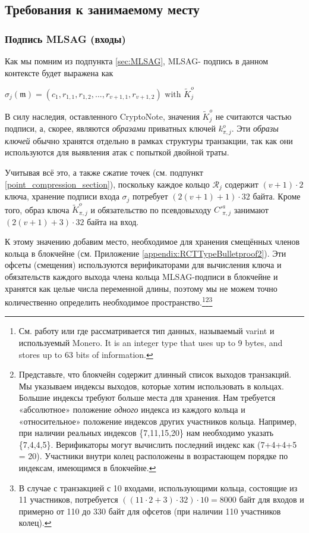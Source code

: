 \subsection{Требования к занимаемому месту}
\label{subsec:space-and-ver-rcttypefull}

\subsubsection*{Подпись MLSAG (входы)}

Как мы помним из подпункта \ref{sec:MLSAG}, MLSAG- подпись в данном контексте будет выражена как

\hfill \(\sigma_j(\mathfrak{m}) = (c_1, r_{1, 1}, r_{1, 2}, ..., r_{v+1, 1}, r_{v+1, 2}) \textrm{ with } \tilde{K}^o_j \) \hfill \phantom{.}

В силу наследия, оставленного CryptoNote, значения \(\tilde{K}^o_j\) не считаются частью подписи, а, скорее, являются {\em образами} приватных ключей $k^o_{\pi,j}$. Эти {\em образы ключей} обычно хранятся отдельно в рамках структуры транзакции, так как они используются для выявления атак с попыткой двойной траты.

Учитывая всё это, а также сжатие точек (см. подпункт \ref{point_compression_section}), поскольку каждое кольцо \(\mathcal{R}_j\) содержит \((v+1) \cdot 2\) ключа, хранение подписи входа $\sigma_j$ потребует \( (2(v+1) + 1) \cdot 32  \) байта. Кроме того, образ ключа $\tilde{K}^o_{\pi,j}$ и обязательство по псевдовыходу $C'^a_{\pi,j}$ занимают $(2(v+1)+3) \cdot 32$ байта на вход.

К этому значению добавим место, необходимое для хранения смещённых членов кольца в блокчейне (см. Приложение \ref{appendix:RCTTypeBulletproof2}). Эти офсеты (смещения) используются верификаторами для вычисления ключа и обязательств каждого выхода члена кольца MLSAG-подписи в блокчейне и хранятся как целые числа переменной длины, поэтому мы не можем точно количественно определить необходимое пространство.\footnote{См. работу \cite{varint-description} или \cite{varint-spec} где рассматривается тип данных, называемый varint и используемый Monero. It is an integer type that uses up to 9 bytes, and stores up to 63 bits of information.}\footnote{Представьте, что блокчейн содержит длинный список выходов транзакций. Мы указываем индексы выходов, которые хотим использовать в кольцах. Большие индексы требуют больше места для хранения. Нам требуется «абсолютное» положение {\em одного} индекса из каждого кольца и «относительное» положение индексов других участников кольца. Например, при наличии реальных индексов \{7,11,15,20\} нам необходимо указать \{7,4,4,5\}. Верификаторы могут вычислить последний индекс как (7+4+4+5 = 20). Участники внутри колец расположены в возрастающем порядке по индексам, имеющимся в блокчейне.}\footnote{В случае с транзакцией с 10 входами, использующими кольца, состоящие из 11 участников, потребуется \(((11 \cdot 2 + 3) \cdot 32) \cdot 10 = 8000 \) байт для входов и примерно от 110 до 330 байт для офсетов (при наличии 110 участников колец).}%

